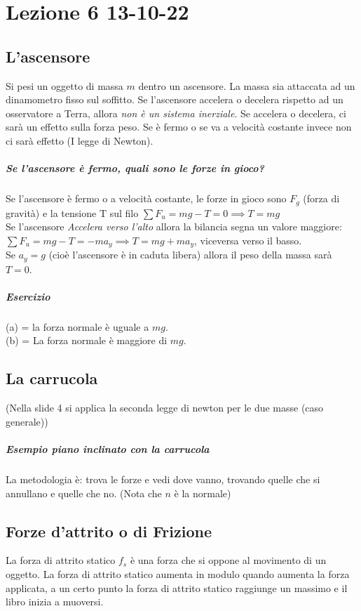 \documentclass[12pt, a4paper, openany]{book}
\begin{document}
\chapter*{Lezione 6 13-10-22}
\section*{L'ascensore}
Si pesi un oggetto di massa $m$ dentro un ascensore.
La massa sia attaccata ad un dinamometro fisso sul soffitto.
Se l'ascensore accelera o decelera rispetto ad un osservatore a Terra, allora \emph{non è un sistema inerziale}.
Se accelera o decelera, ci sarà un effetto sulla forza peso.
Se è fermo o se va a velocità costante invece non ci sarà effetto (I legge
di Newton).

\paragraph*{Se l'ascensore è fermo, quali sono le forze in gioco?}
Se l'ascensore è fermo o a velocità costante, le forze in gioco sono $F_g$ (forza di gravità) e la tensione T sul filo
$\sum F_u = mg-T=0 \implies T=mg$
\\Se l'ascensore \emph{Accelera verso l'alto} allora la bilancia segna un valore maggiore: $\sum F_u = mg-T=-ma_y \implies T=mg + ma_y$, viceversa verso il basso.
\\Se $a_y = g$ (cioè l'ascensore è in caduta libera) allora il peso della massa sarà $T=0$.
\paragraph*{Esercizio} %
(a) = la forza normale è uguale a $mg$.
\\(b) = La forza normale è maggiore di $mg$.

\section{La carrucola} (Nella slide 4 si applica la seconda legge di newton per le due masse (caso generale))
\paragraph*{Esempio piano inclinato con la carrucola} La metodologia è: trova le forze e vedi dove vanno, trovando quelle che si annullano e quelle che no.
(Nota che $n$ è la normale)

\section{Forze d'attrito o di Frizione}
La forza di attrito statico $f_s$ è una forza che si oppone al movimento di un oggetto.
La forza di attrito statico aumenta in modulo quando aumenta la forza applicata, a un certo punto la forza di attrito statico raggiunge un massimo e il libro inizia a muoversi.
\end{document}
